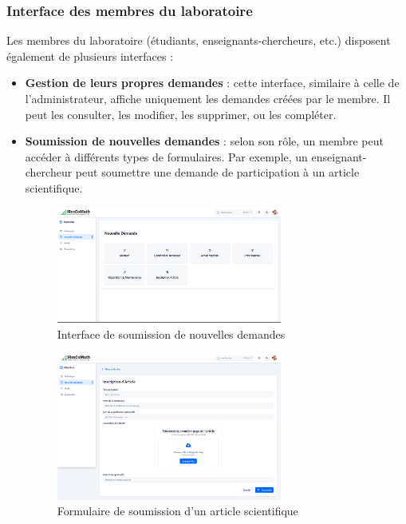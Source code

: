 \subsubsection{Interface des membres du laboratoire}

Les membres du laboratoire (étudiants, enseignants-chercheurs, etc.) disposent également de plusieurs interfaces :

\begin{itemize}
    \item \textbf{Gestion de leurs propres demandes} : cette interface, similaire à celle de l’administrateur, affiche uniquement les demandes créées par le membre. Il peut les consulter, les modifier, les supprimer, ou les compléter.
  
    \item \textbf{Soumission de nouvelles demandes} : selon son rôle, un membre peut accéder à différents types de formulaires. Par exemple, un enseignant-chercheur peut soumettre une demande de participation à un article scientifique.
    \begin{figure}[H]
        \centering
        \includegraphics[width=0.7\textwidth]{images/interface/nouvelle_demande.png}
        \caption{Interface de soumission de nouvelles demandes}
        \label{fig:nouvelles_demandes}
    \end{figure}

    \begin{figure}[H]
        \centering
        \includegraphics[width=0.7\textwidth]{images/interface/inscriptionArticle.png}
        \caption{Formulaire de soumission d’un article scientifique}
        \label{fig:articleScientifique}
    \end{figure}
\end{itemize}
